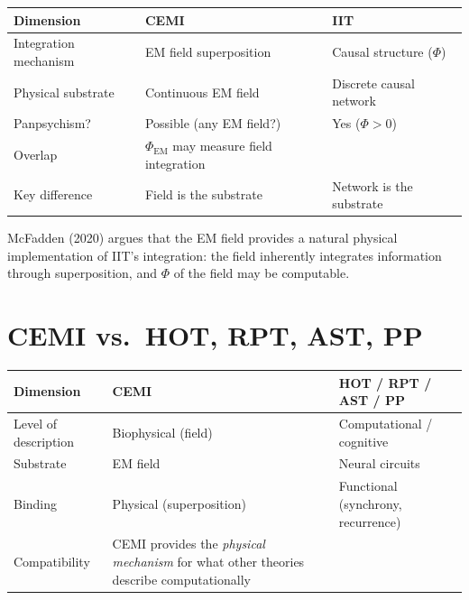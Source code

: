 \documentclass[11pt,a4paper]{report}
\begin{document}
\begin{compbox}
\renewcommand{\arraystretch}{1.4}
\begin{tabular}{>{\raggedright}p{3cm} >{\raggedright}p{5.2cm} >{\raggedright\arraybackslash}p{4.8cm}}
  \toprule
  \textbf{Dimension} & \textbf{CEMI} & \textbf{IIT} \\
  \midrule
  Integration mechanism & EM field superposition & Causal structure ($\Phi$) \\
  Physical substrate & Continuous EM field & Discrete causal network \\
  Panpsychism? & Possible (any EM field?) & Yes ($\Phi > 0$) \\
  Overlap & $\Phi_{\text{EM}}$ may measure field integration \\
  Key difference & Field is the substrate & Network is the substrate \\
  \bottomrule
\end{tabular}
\end{compbox}

McFadden (2020) argues that the EM field provides a natural physical implementation of IIT's integration: the field inherently integrates information through superposition, and $\Phi$ of the field may be computable.

\section{CEMI vs.\ HOT, RPT, AST, PP}

\begin{compbox}
\renewcommand{\arraystretch}{1.4}
\begin{tabular}{>{\raggedright}p{3cm} >{\raggedright}p{5.2cm} >{\raggedright\arraybackslash}p{4.8cm}}
  \toprule
  \textbf{Dimension} & \textbf{CEMI} & \textbf{HOT / RPT / AST / PP} \\
  \midrule
  Level of description & Biophysical (field) & Computational / cognitive \\
  Substrate & EM field & Neural circuits \\
  Binding & Physical (superposition) & Functional (synchrony, recurrence) \\
  Compatibility & CEMI provides the \emph{physical mechanism} for what other theories describe computationally \\
  \bottomrule
\end{tabular}
\end{compbox}
\end{document}

